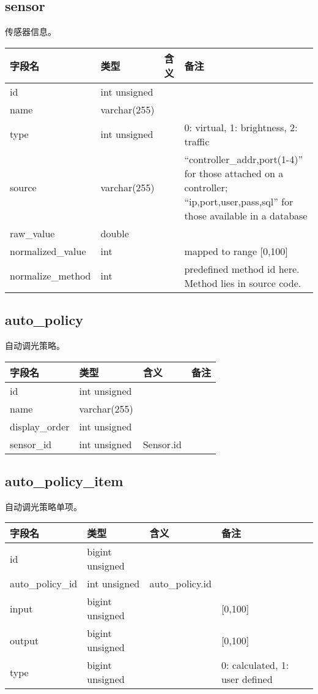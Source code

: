 \subsection{sensor}\label{sensor}

传感器信息。

\begin{longtabu}[c]{@{}lXXX@{}}
\toprule
字段名 & 类型 & 含义 & 备注\tabularnewline
\midrule
\endhead
id & int unsigned & &\tabularnewline
name & varchar(255) & &\tabularnewline
type & int unsigned & & 0: virtual, 1: brightness, 2:
traffic\tabularnewline
source & varchar(255) & & ``controller\_addr,port(1-4)'' for those
attached on a controller; ``ip,port,user,pass,sql'' for those available
in a database\tabularnewline
raw\_value & double & &\tabularnewline
normalized\_value & int & & mapped to range {[}0,100{]}\tabularnewline
normalize\_method & int & & predefined method id here. Method lies in
source code.\tabularnewline
\bottomrule
\end{longtabu}

\subsection{auto\_policy}\label{autoux5fpolicy}

自动调光策略。

\begin{longtabu}[c]{@{}lXXX@{}}
\toprule
字段名 & 类型 & 含义 & 备注\tabularnewline
\midrule
\endhead
id & int unsigned & &\tabularnewline
name & varchar(255) & &\tabularnewline
display\_order & int unsigned & &\tabularnewline
sensor\_id & int unsigned & Sensor.id &\tabularnewline
\bottomrule
\end{longtabu}

\subsection{auto\_policy\_item}\label{autoux5fpolicyux5fitem}

自动调光策略单项。

\begin{longtabu}[c]{@{}lXXX@{}}
\toprule
字段名 & 类型 & 含义 & 备注\tabularnewline
\midrule
\endhead
id & bigint unsigned & &\tabularnewline
auto\_policy\_id & int unsigned & auto\_policy.id &\tabularnewline
input & bigint unsigned & & {[}0,100{]}\tabularnewline
output & bigint unsigned & & {[}0,100{]}\tabularnewline
type & bigint unsigned & & 0: calculated, 1: user defined\tabularnewline
\bottomrule
\end{longtabu}

